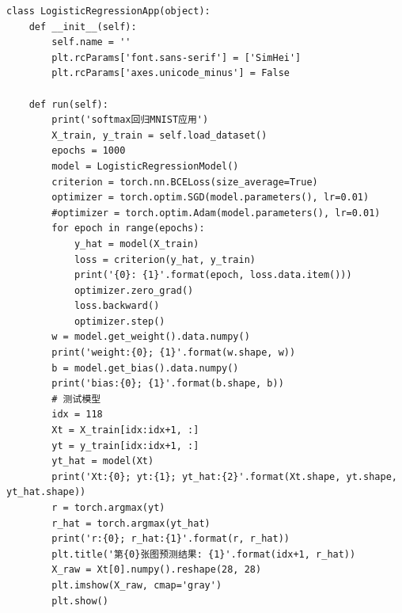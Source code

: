 \documentclass[UTF8]{article}
\begin{document}
\begin{lstlisting}
class LogisticRegressionApp(object):
    def __init__(self):
        self.name = ''
        plt.rcParams['font.sans-serif'] = ['SimHei']
        plt.rcParams['axes.unicode_minus'] = False

    def run(self):
        print('softmax回归MNIST应用')
        X_train, y_train = self.load_dataset()
        epochs = 1000
        model = LogisticRegressionModel()
        criterion = torch.nn.BCELoss(size_average=True)
        optimizer = torch.optim.SGD(model.parameters(), lr=0.01)
        #optimizer = torch.optim.Adam(model.parameters(), lr=0.01)
        for epoch in range(epochs):
            y_hat = model(X_train)
            loss = criterion(y_hat, y_train)
            print('{0}: {1}'.format(epoch, loss.data.item()))
            optimizer.zero_grad()
            loss.backward()
            optimizer.step()
        w = model.get_weight().data.numpy()
        print('weight:{0}; {1}'.format(w.shape, w))
        b = model.get_bias().data.numpy()
        print('bias:{0}; {1}'.format(b.shape, b))
        # 测试模型
        idx = 118
        Xt = X_train[idx:idx+1, :]
        yt = y_train[idx:idx+1, :]
        yt_hat = model(Xt)
        print('Xt:{0}; yt:{1}; yt_hat:{2}'.format(Xt.shape, yt.shape, yt_hat.shape))
        r = torch.argmax(yt)
        r_hat = torch.argmax(yt_hat)
        print('r:{0}; r_hat:{1}'.format(r, r_hat))
        plt.title('第{0}张图预测结果: {1}'.format(idx+1, r_hat))
        X_raw = Xt[0].numpy().reshape(28, 28)
        plt.imshow(X_raw, cmap='gray')
        plt.show()


\end{lstlisting}
\end{document}
